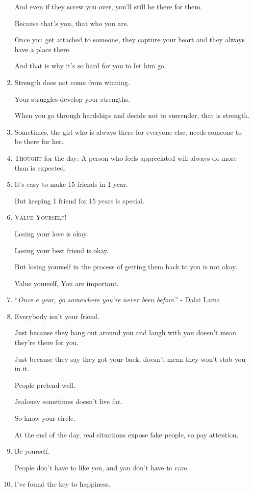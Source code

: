 \documentclass{article}
\begin{document}
\begin{enumerate}
	And even if they screw you over, you'll still be there for them.
	
	Because that's you, that who you are.
	
	Once you get attached to someone, they capture your heart and they always have a place there.
	
	And that is why it's so hard for you to let him go.
	\item Strength does not come from winning.
	
	Your struggles develop your strengths.
	
	When you go through hardships and decide not to surrender, that is strength.
	\item Sometimes, the girl who is always there for everyone else, needs someone to be there for her.
	\item \textsc{Thought} for the day: A person who feels appreciated will always do more than is expected.
	\item It's easy to make 15 friends in 1 year.
	
	But keeping 1 friend for 15 years is special.
	\item \textsc{Value Yourself!}
	
	Losing your love is okay.
	
	Losing your best friend is okay.
	
	But losing yourself in the process of getting them back to you is not okay.
	
	Value yourself, You are important.
	\item ``\textit{Once a year, go somewhere you're never been before}.'' - Dalai Lama
	\item Everybody isn't your friend.
	
	Just because they hang out around you and laugh with you doesn't mean they're there for you.
	
	Just because they say they got your back, doesn't mean they won't stab you in it.
	
	People pretend well.
	
	Jealousy sometimes doesn't live far.
	
	So know your circle.
	
	At the end of the day, real situations expose fake people, so pay attention.
	\item Be yourself.
	
	People don't have to like you, and you don't have to care.
	\item I've found the key to happiness.
	

\end{enumerate}
\end{document}
